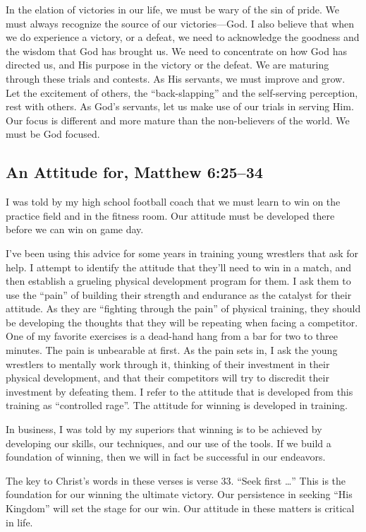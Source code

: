 \documentclass[12pt]{memoir}
\begin{document}
In the elation of victories in our life, we must be wary of the sin
of pride. We must always recognize the source of our victories---God.
I also believe that when we do experience a victory, or a defeat,
we need to acknowledge the goodness and the wisdom that God has brought
us. We need to concentrate on how God has directed us, and His purpose
in the victory or the defeat. We are maturing through these trials
and contests. As His servants, we must improve and grow. Let the excitement
of others, the ``back-slapping'' and the self-serving perception,
rest with others. As God's servants, let us make use of our trials
in serving Him. Our focus is different and more mature than the non-believers
of the world. We must be God focused.

\subsection{An Attitude for, Matthew 6:25--34}

I was told by my high school football coach that we must learn to
win on the practice field and in the fitness room. Our attitude must
be developed there before we can win on game day.

I've been using this advice for some years in training young wrestlers
that ask for help. I attempt to identify the attitude that they'll
need to win in a match, and then establish a grueling physical development
program for them. I ask them to use the ``pain'' of building their
strength and endurance as the catalyst for their attitude. As they
are ``fighting through the pain'' of physical training, they should
be developing the thoughts that they will be repeating when facing
a competitor. One of my favorite exercises is a dead-hand hang from
a bar for two to three minutes. The pain is unbearable at first. As
the pain sets in, I ask the young wrestlers to mentally work through
it, thinking of their investment in their physical development, and
that their competitors will try to discredit their investment by defeating
them. I refer to the attitude that is developed from this training
as ``controlled rage''. The attitude for winning is developed in
training.

In business, I was told by my superiors that winning is to be achieved
by developing our skills, our techniques, and our use of the tools.
If we build a foundation of winning, then we will in fact be successful
in our endeavors. 

The key to Christ's words in these verses is verse 33. ``Seek first
\dots  '' This is the foundation for our winning the ultimate victory.
Our persistence in seeking ``His Kingdom'' will set the stage for
our win. Our attitude in these matters is critical in life. 
\end{document}
